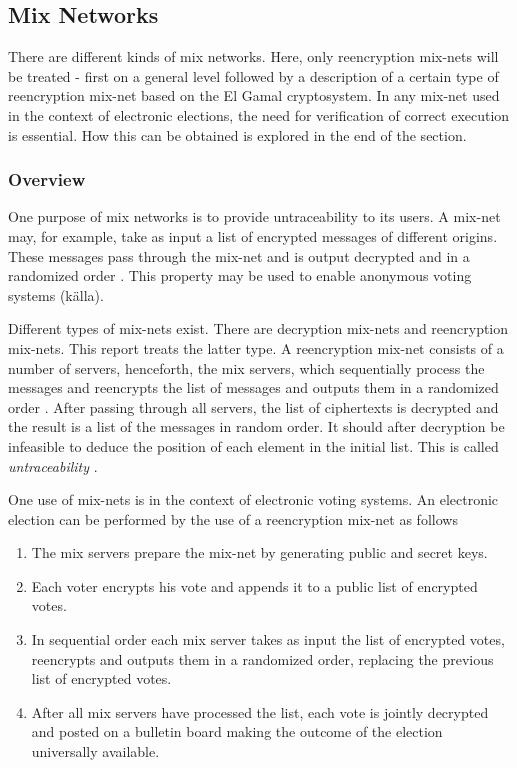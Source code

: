 \subsection{Mix Networks}

There are different kinds of mix networks. Here, only reencryption
mix-nets will be treated - first on a general level followed by a
description of a certain type of reencryption mix-net based on the El
Gamal cryptosystem. In any mix-net used in the context of electronic
elections, the need for verification of correct execution is
essential. How this can be obtained is explored in the end of the
section.

\subsubsection{Overview}
One purpose of mix networks is to provide untraceability to its
users. A mix-net may, for example, take as input a list of encrypted
messages of different origins. These messages pass through the mix-net
and is output decrypted and in a randomized order \cite{mixnets}. This
property may be used to enable anonymous voting systems (källa).

Different types of mix-nets exist. There are decryption mix-nets and
reencryption mix-nets. This report treats the latter type. A
reencryption mix-net consists of a number of servers, henceforth, the
mix servers, which sequentially process the messages and reencrypts
the list of messages and outputs them in a randomized order
\cite{mixnets}. After passing through all servers, the list of
ciphertexts is decrypted and the result is a list of the messages in
random order. It should after decryption be infeasible to deduce the
position of each element in the initial list. This is called
\emph{untraceability} \cite{mixnets2}.

One use of mix-nets is in the context of electronic voting systems. An
electronic election can be performed by the use of a reencryption
mix-net as follows \cite{electronicvoting} \\
\begin{enumerate}
\item The mix servers prepare the mix-net by generating public and
  secret keys.
\item Each voter encrypts his vote and appends it to a public list of
  encrypted votes.
\item In sequential order each mix server takes as input the list of
  encrypted votes, reencrypts and outputs them in a randomized order,
  replacing the previous list of encrypted votes.
\item After all mix servers have processed the list, each vote is
  jointly decrypted and posted on a bulletin board making the outcome
  of the election universally available.
\end{enumerate}

